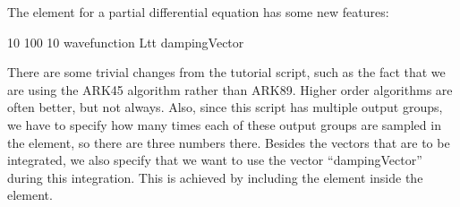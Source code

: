 \documentclass[letterpaper,10pt,english]{sphinxmanual}
\begin{document}
\sphinxAtStartPar
The  element for a partial differential equation has some new features:

\begin{sphinxVerbatim}[commandchars=\\\{\}]
   
  10 100 10
    wavefunction
     
      Ltt
      \PYG{c+cp}{\PYGZlt{}![CDATA[}
          
      \PYG{c+cp}{]]\PYGZgt{}}
    \PYG{c+cp}{\PYGZlt{}![CDATA[}
      \PYG{p}{[}\PYG{p}{]}    
    \PYG{c+cp}{]]\PYGZgt{}}
    dampingVector
\end{sphinxVerbatim}

\sphinxAtStartPar
There are some trivial changes from the tutorial script, such as the fact that we are using the ARK45 algorithm rather than ARK89.  Higher order algorithms are often better, but not always.  Also, since this script has multiple output groups, we have to specify how many times each of these output groups are sampled in the  element, so there are three numbers there.  Besides the vectors that are to be integrated, we also specify that we want to use the vector “dampingVector” during this integration.  This is achieved by including the  element inside the  element.
\end{document}
